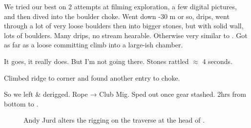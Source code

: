 We tried our best on 2 attempts at filming exploration, a few digital
pictures, and then dived into the boulder choke. Went down -30 m or so,
drips, went through a lot of very loose boulders then into bigger
stones, but with solid wall, lots of boulders. Many drips, no stream
hearable. Otherwise very similar to . Got as far as
a loose committing climb into a large-ish chamber.

It goes, it really does. But I'm not going there. Stones rattled
$\approx$ 4 seconds.

Climbed ridge to corner and found another entry to choke.

So we left \& derigged. Rope → Club Mig. Sped out once gear stashed.
2hrs from bottom to .



\begin{figure}
\checkoddpage \ifoddpage \forcerectofloat \else \forceversofloat \fi
\centering
 \caption{Andy Jurd alters the rigging on the traverse at the head of \protect{}. }
 \label{Plopzilla traverse}
\end{figure}